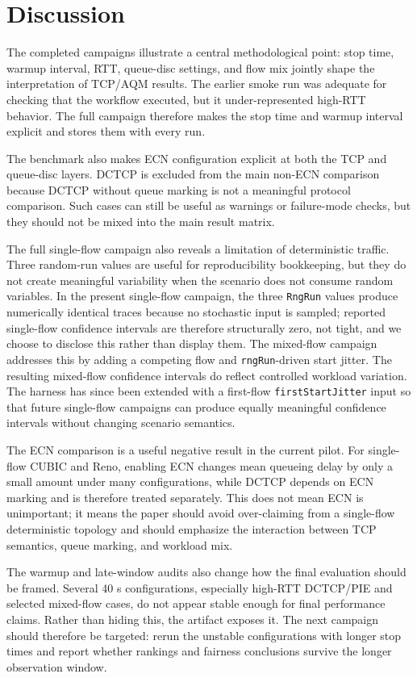 \section{Discussion}

The completed campaigns illustrate a central methodological point: stop time, warmup interval, RTT, queue-disc settings, and flow mix jointly shape the interpretation of TCP/AQM results. The earlier smoke run was adequate for checking that the workflow executed, but it under-represented high-RTT behavior. The full campaign therefore makes the stop time and warmup interval explicit and stores them with every run.

The benchmark also makes ECN configuration explicit at both the TCP and queue-disc layers. DCTCP is excluded from the main non-ECN comparison because DCTCP without queue marking is not a meaningful protocol comparison. Such cases can still be useful as warnings or failure-mode checks, but they should not be mixed into the main result matrix.

The full single-flow campaign also reveals a limitation of deterministic traffic. Three random-run values are useful for reproducibility bookkeeping, but they do not create meaningful variability when the scenario does not consume random variables. In the present single-flow campaign, the three \texttt{RngRun} values produce numerically identical traces because no stochastic input is sampled; reported single-flow confidence intervals are therefore structurally zero, not tight, and we choose to disclose this rather than display them. The mixed-flow campaign addresses this by adding a competing flow and \texttt{rngRun}-driven start jitter. The resulting mixed-flow confidence intervals do reflect controlled workload variation. The harness has since been extended with a first-flow \texttt{firstStartJitter} input so that future single-flow campaigns can produce equally meaningful confidence intervals without changing scenario semantics.

The ECN comparison is a useful negative result in the current pilot. For single-flow CUBIC and Reno, enabling ECN changes mean queueing delay by only a small amount under many configurations, while DCTCP depends on ECN marking and is therefore treated separately. This does not mean ECN is unimportant; it means the paper should avoid over-claiming from a single-flow deterministic topology and should emphasize the interaction between TCP semantics, queue marking, and workload mix.

The warmup and late-window audits also change how the final evaluation should be framed. Several 40 s configurations, especially high-RTT DCTCP/PIE and selected mixed-flow cases, do not appear stable enough for final performance claims. Rather than hiding this, the artifact exposes it. The next campaign should therefore be targeted: rerun the unstable configurations with longer stop times and report whether rankings and fairness conclusions survive the longer observation window.

